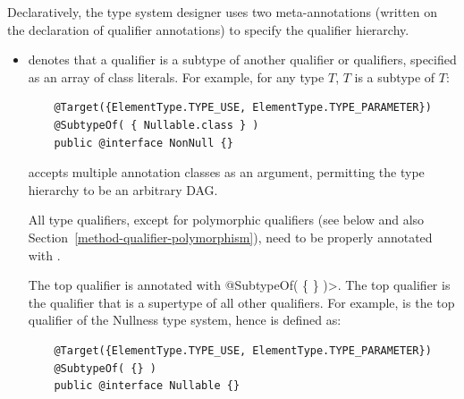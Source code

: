 Declaratively, the type system designer uses two meta-annotations (written
on the declaration of qualifier annotations) to specify the qualifier
hierarchy.

\begin{itemize}

\item {} denotes that a qualifier is a subtype of
  another qualifier or qualifiers, specified as an array of class
  literals.  For example, for any type $T$,
   $T$ is a subtype of  $T$:

  \begin{Verbatim}
    @Target({ElementType.TYPE_USE, ElementType.TYPE_PARAMETER})
    @SubtypeOf( { Nullable.class } )
    public @interface NonNull {}
  \end{Verbatim}



   accepts multiple annotation classes as an argument,
  permitting the type hierarchy to be an arbitrary DAG\@.


  All type qualifiers, except for polymorphic qualifiers (see below and
  also Section~\ref{method-qualifier-polymorphism}), need to be
  properly annotated with .

  The top qualifier is annotated with
  \<@SubtypeOf( \{ \} )>.  The top qualifier is the qualifier that is
  a supertype of all other qualifiers.  For example, 
  is the top qualifier of the Nullness type system, hence is defined as:

  \begin{Verbatim}
    @Target({ElementType.TYPE_USE, ElementType.TYPE_PARAMETER})
    @SubtypeOf( {} )
    public @interface Nullable {}
  \end{Verbatim}


\end{itemize}
